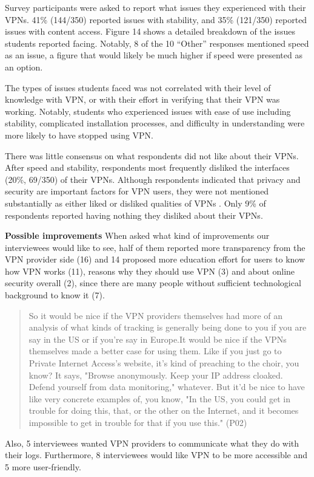 Survey participants were asked to report what issues they experienced with
their VPNs. 41\% (144/350) reported issues with stability, and 35\% (121/350)
reported issues with content access. Figure 14 shows a detailed breakdown of
the issues students reported facing. Notably, 8 of the 10 “Other” responses
mentioned speed as an issue, a figure that would likely be much higher if
speed were presented as an option.

The types of issues students faced was not correlated with their level of
knowledge with VPN, or with their effort in verifying that their VPN was
working. Notably, students who experienced issues with ease of use including
stability, complicated installation processes, and difficulty in understanding
were more likely to have stopped using VPN.



There was little consensus on what respondents did not like about their VPNs.
After speed and stability, respondents most frequently disliked the interfaces
(20\%, 69/350) of their VPNs. Although respondents indicated that privacy and
security are important factors for VPN users, they were not mentioned
substantially as either liked or disliked qualities of VPNs . Only 9\% of respondents reported
having nothing they disliked about their VPNs.



\textbf{Possible improvements} When asked what kind of improvements our
interviewees would like to see, half of them reported more transparency from
the VPN provider side (16) and 14 proposed more education effort for users to
know how VPN works (11), reasons why they should use VPN (3) and about online
security overall (2), since there are many people without sufficient
technological background to know it (7). 

\begin{quote}So it would be nice if the VPN providers themselves had more of
    an analysis of what kinds of tracking is generally being done to you if
    you are say in the US or if you're say in Europe.It would be nice if the
    VPNs themselves made a better case for using them. Like if you just go to
    Private Internet Access's website, it's kind of preaching to the choir,
    you know? It says, "Browse anonymously. Keep your IP address cloaked.
    Defend yourself from data monitoring," whatever. But it'd be nice to have
    like very concrete examples of, you know, "In the US, you could get in
    trouble for doing this, that, or the other on the Internet, and it becomes
    impossible to get in trouble for that if you use this." (P02)\end{quote}


Also, 5 interviewees wanted VPN providers to communicate what they do with
their logs. Furthermore, 8 interviewees would like VPN to be more accessible
and 5 more user-friendly. 




